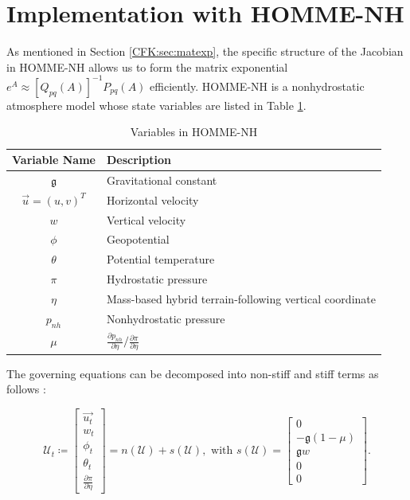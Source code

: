 \documentclass{csri19}
\newcommand{\CFKg}{\mathfrak{g}}
\newcommand{\CFKU}{\mathcal{U}}
\begin{document}
\section{Implementation with HOMME-NH}\label{CFK:sec:homme}
As mentioned in Section \ref{CFK:sec:matexp}, the specific structure of 
the Jacobian in HOMME-NH allows us to form the matrix exponential $e^A 
\approx \left[Q_{pq}(A)\right]^{-1}P_{pq}(A)$ efficiently. HOMME-NH is a 
nonhydrostatic atmosphere model whose state variables are listed in Table 
\ref{CFK:tab:variables}. 
\begin{table}[ht]
  \caption{Variables in HOMME-NH}
  \label{CFK:tab:variables}
  \begin{center}
    \begin{tabular}{|c|l|}
      \hline
      \textbf{Variable Name} & \textbf{Description} \\
      \hline
      $\CFKg$                       & Gravitational constant                                  \\
      $\vec{u}=\left(u,v\right)^T$  & Horizontal velocity                                     \\
      $w$                           & Vertical velocity                                       \\
      $\phi$                        & Geopotential                                            \\
      $\theta$                      & Potential temperature                                   \\
      $\pi$                         & Hydrostatic pressure                                    \\
      $\eta$                        & Mass-based hybrid terrain-following vertical coordinate \\
      $p_{nh}$                      & Nonhydrostatic pressure                                 \\
      $\mu$                         & $\frac{\partial p_{nh}}{\partial\eta}/\frac{\partial\pi}{\partial\eta}$  \\
      \hline
    \end{tabular}
  \end{center}
\end{table}
The governing equations can be decomposed into non-stiff and stiff terms as follows \cite{CFK:Steyer2019}:



\[ \CFKU_t \coloneqq \begin{bmatrix} \vec{u_t} \\
w_t\\
\phi_t\\
\theta_t\\
\frac{\partial \pi}{\partial \eta}
\end{bmatrix} = n(\CFKU) + s(\CFKU),\text{ with }
 s(\CFKU) = \begin{bmatrix}
0\\
-\CFKg (1-\mu)\\
\CFKg w\\
0\\
0\end{bmatrix}.\]
\end{document}
